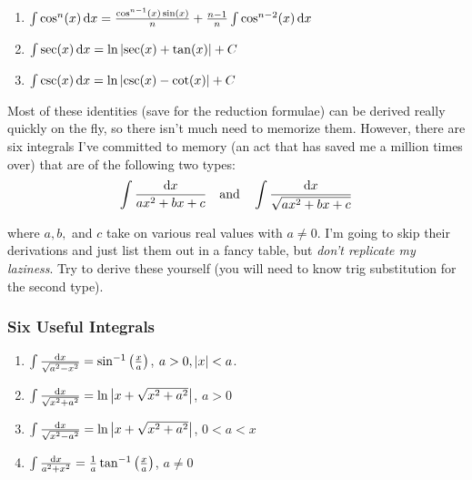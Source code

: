 \documentclass{article}
\begin{document}
{\begin{enumerate}
      \item \(\int \cos^n(x) \, \mathrm{d} x = \frac{\cos^{n-1}(x) \sin(x)}{n} + \frac{n-1}{n} \int \cos^{n-2}(x) \, \mathrm{d} x\)
      
      \item \(\int \sec(x) \, \mathrm{d} x = \ln\left\lvert \sec(x) + \tan(x)\right\rvert + C\)
      
      \item \(\int \csc(x) \, \mathrm{d} x = \ln\left\lvert \csc(x) -\cot(x)\right\rvert + C\)
       
    \end{enumerate}

    Most of these identities (save for the reduction formulae)  can be derived really quickly on the fly, so there isn't much need to memorize them. However, there are six integrals I've committed to memory (an act that has saved me a million times over) that are of the following two types:
    \begin{align*}
      \int \frac{\mathrm{d} x}{ax^2 + bx + c} \quad \text{and} \quad \int \frac{\mathrm{d} x}{\sqrt{ax^2 + bx + c}}
    \end{align*}

    where \(a, b,\) and \(c\) take on various real values with \(a \neq 0\). I'm going to skip their derivations and just list them out in a fancy table, but \emph{don't replicate my laziness}. Try to derive these yourself (you will need to know trig substitution for the second type).

    \subsubsection*{Six Useful Integrals}
    \begin{enumerate}
      \item \(\int \frac{\mathrm{d} x}{\sqrt{a^2-x^2}} = \sin^{-1}\left(\frac{x}{a}\right)\), \hspace*{1cm} \(a > 0, \left\lvert x\right\rvert < a\).
      
      \item \(\int \frac{\mathrm{d} x}{\sqrt{x^2+a^2}} = \ln\left\lvert x + \sqrt{x^2 + a^2}\right\rvert\), \hspace*{1cm} \(a > 0\)
    
      \item \(\int \frac{\mathrm{d} x}{\sqrt{x^2 - a^2}} = \ln\left\lvert x + \sqrt{x^2 + a^2}\right\rvert\), \hspace*{1cm} \(0 < a < x\)
      
      \item \(\int \frac{\mathrm{d} x}{a^2 + x^2} = \frac{1}{a}\tan^{-1}\left(\frac{x}{a}\right)\),\hspace*{1cm} \(a \neq 0\)
      

\end{enumerate}}
\end{document}

